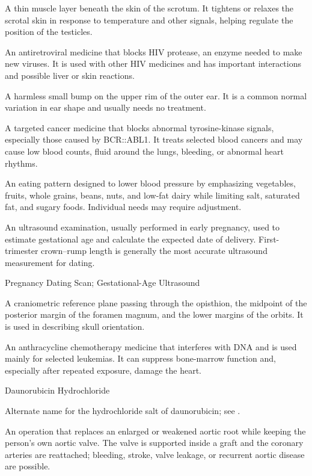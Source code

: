  A thin muscle layer beneath the skin of the scrotum. It tightens or relaxes the scrotal skin in response to temperature and other signals, helping regulate the position of the testicles.

 An antiretroviral medicine that blocks HIV protease, an enzyme needed to make new viruses. It is used with other HIV medicines and has important interactions and possible liver or skin reactions.

 A harmless small bump on the upper rim of the outer ear. It is a common normal variation in ear shape and usually needs no treatment.

 A targeted cancer medicine that blocks abnormal tyrosine-kinase signals, especially those caused by BCR::ABL1. It treats selected blood cancers and may cause low blood counts, fluid around the lungs, bleeding, or abnormal heart rhythms.

 An eating pattern designed to lower blood pressure by emphasizing vegetables, fruits, whole grains, beans, nuts, and low-fat dairy while limiting salt, saturated fat, and sugary foods. Individual needs may require adjustment.

 An ultrasound examination, usually performed in early pregnancy, used to estimate gestational age and calculate the expected date of delivery.
First-trimester crown--rump length is generally the most accurate ultrasound measurement for dating.

\synonyms
Pregnancy Dating Scan; Gestational-Age Ultrasound

 A craniometric reference plane passing through the opisthion, the midpoint of the posterior margin of the foramen magnum, and the lower margins of the orbits. It is used in describing skull orientation.

 An anthracycline chemotherapy medicine that interferes with DNA and is used mainly for selected leukemias. It can suppress bone-marrow function and, especially after repeated exposure, damage the heart.

\synonyms
Daunorubicin Hydrochloride

 Alternate name for the hydrochloride salt of daunorubicin; see .

 An operation that replaces an enlarged or weakened aortic root while keeping the person's own aortic valve. The valve is supported inside a graft and the coronary arteries are reattached; bleeding, stroke, valve leakage, or recurrent aortic disease are possible.

